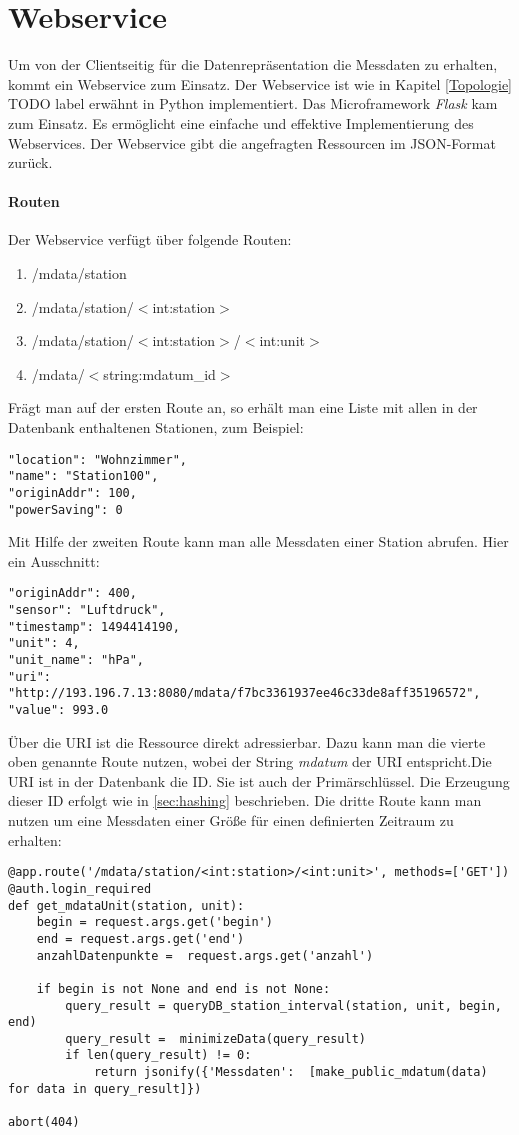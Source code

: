 \section{Webservice}
Um von der Clientseitig für die Datenrepräsentation die Messdaten zu erhalten, kommt ein Webservice zum Einsatz. Der Webservice ist wie in Kapitel \ref{Topologie} TODO label erwähnt in Python implementiert. Das Microframework \textit{Flask} kam zum Einsatz. Es ermöglicht eine einfache und effektive Implementierung des Webservices. Der Webservice gibt die angefragten Ressourcen im JSON-Format zurück. 

\paragraph{Routen}
Der Webservice verfügt über folgende Routen: 
\begin{enumerate}
\item /mdata/station
\item /mdata/station/$<$int:station$>$
\item /mdata/station/$<$int:station$>$/$<$int:unit$>$
\item /mdata/$<$string:mdatum\_id$>$
\end{enumerate} 
Frägt man auf der ersten Route an, so erhält man eine Liste mit allen in der Datenbank enthaltenen Stationen, zum Beispiel:
\lstset{language=c, numbers=none, breaklines=true}
\begin{lstlisting}
"location": "Wohnzimmer", 
"name": "Station100", 
"originAddr": 100, 
"powerSaving": 0
\end{lstlisting}
Mit Hilfe der zweiten Route kann man alle Messdaten einer Station abrufen. Hier ein Ausschnitt:
\lstset{language=c, numbers=none, breaklines=true}
\begin{lstlisting}
"originAddr": 400, 
"sensor": "Luftdruck", 
"timestamp": 1494414190, 
"unit": 4, 
"unit_name": "hPa", 
"uri": "http://193.196.7.13:8080/mdata/f7bc3361937ee46c33de8aff35196572", 
"value": 993.0
\end{lstlisting}
Über die URI ist die Ressource direkt adressierbar. Dazu kann man die vierte oben genannte Route nutzen, wobei der String \textit{mdatum} der URI entspricht.Die URI ist in der Datenbank die ID. Sie ist auch der Primärschlüssel. Die Erzeugung dieser ID erfolgt wie in \ref{sec:hashing} beschrieben. 
Die dritte Route kann man nutzen um eine Messdaten einer Größe für einen definierten Zeitraum zu erhalten:
\lstset{language=python, numbers=left, breaklines=true}
\begin{lstlisting}
@app.route('/mdata/station/<int:station>/<int:unit>', methods=['GET'])
@auth.login_required
def get_mdataUnit(station, unit):
    begin = request.args.get('begin')
    end = request.args.get('end')
    anzahlDatenpunkte =  request.args.get('anzahl')

    if begin is not None and end is not None:
        query_result = queryDB_station_interval(station, unit, begin, end)
        query_result =  minimizeData(query_result)
        if len(query_result) != 0:
            return jsonify({'Messdaten':  [make_public_mdatum(data) for data in query_result]})

abort(404)
\end{lstlisting} 
